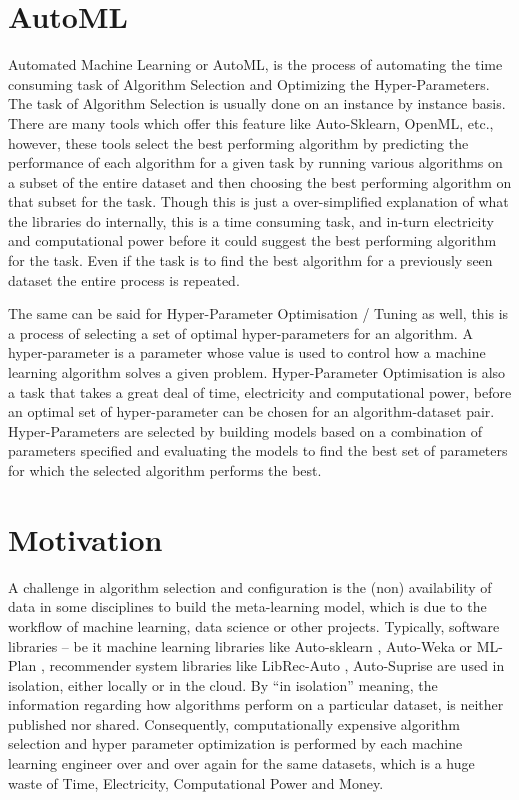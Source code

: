 \section{AutoML}
Automated Machine Learning or AutoML, is the process of automating the time consuming task of Algorithm Selection and Optimizing the Hyper-Parameters. The task of Algorithm Selection is usually done on an instance by instance basis. There are many tools which offer this feature like Auto-Sklearn, OpenML, etc., however, these tools select the best performing algorithm by predicting the performance of each algorithm for a given task by running various algorithms on a subset of the entire dataset and then choosing the best performing algorithm on that subset for the task. Though this is just a over-simplified explanation of what the libraries do internally, this is a time consuming task, and in-turn electricity and computational power before it could suggest the best performing algorithm for the task. Even if the task is to find the best algorithm for a previously seen dataset the entire process is repeated.

The same can be said for Hyper-Parameter Optimisation / Tuning as well, this is a process of selecting a set of optimal hyper-parameters for an algorithm. A hyper-parameter is a parameter whose value is used to control how a machine learning algorithm solves a given problem. Hyper-Parameter Optimisation is also a task that takes a great deal of time, electricity and computational power, before an optimal set of hyper-parameter can be chosen for an algorithm-dataset pair. Hyper-Parameters are selected by building models based on a combination of parameters specified and evaluating the models to find the best set of parameters for which the selected algorithm performs the best.

\section{Motivation}
A challenge in algorithm selection and configuration is the (non) availability of data in some disciplines to build the meta-learning model, which is due to the workflow of machine learning, data science or other projects. Typically, software libraries – be it machine learning libraries like Auto-sklearn \citep{feurer:m}, Auto-Weka \citep{kotthoff:l} or ML-Plan \citep{mohr:f}, recommender system libraries like LibRec-Auto \citep{mansoury:m}, Auto-Suprise \citep{rohan-joeran} are used in isolation, either locally or in the cloud. By “in isolation” meaning, the information regarding how algorithms perform on a particular dataset, is neither published nor shared. Consequently, computationally expensive algorithm selection and hyper parameter optimization is performed by each machine learning engineer over and over again for the same datasets, which is a huge waste of Time, Electricity, Computational Power and Money.

